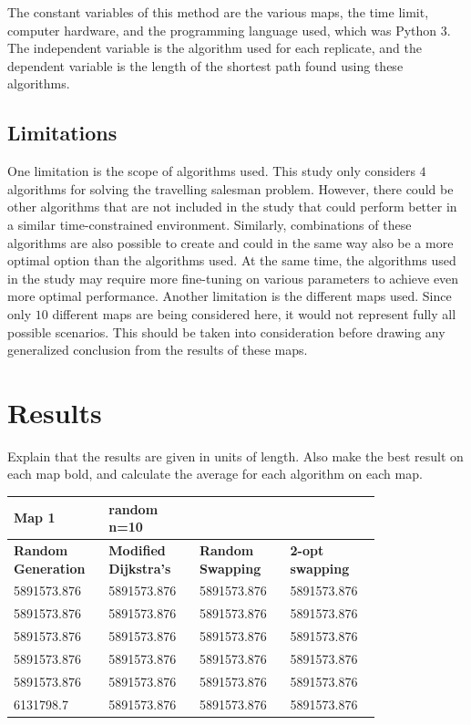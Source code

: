 \documentclass{article}
\begin{document}
\noindent
The constant variables of this method are the various maps, the time limit, computer hardware, and the programming language used, which was Python 3. The independent variable is the algorithm used for each replicate, and the dependent variable is the length of the shortest path found using these algorithms.


\subsection{Limitations}\label{Limitations}
One limitation is the scope of algorithms used. This study only considers $4$ algorithms for solving the travelling salesman problem. However, there could be other algorithms that are not included in the study that could perform better in a similar time-constrained environment. Similarly, combinations of these algorithms are also possible to create and could in the same way also be a more optimal option than the algorithms used. 
\noindent
At the same time, the algorithms used in the study may require more fine-tuning on various parameters to achieve even more optimal performance. 
\noindent
Another limitation is the different maps used. Since only $10$ different maps are being considered here, it would not represent fully all possible scenarios. This should be taken into consideration before drawing any generalized conclusion from the results of these maps.


\section{Results}\label{Results}

Explain that the results are given in units of length. 
Also make the best result on each map bold, and calculate the average for each algorithm on each map.





\begin{table}[H]
    \centering
    \begin{tabular}{|p{0.2\linewidth}|p{0.2\linewidth}|p{0.2\linewidth}|p{0.2\linewidth}|}
    \hline
        \textbf{Map 1 } & random n=10 & ~ & ~ \\ \hline
        \textbf{Random Generation} & \textbf{Modified Dijkstra's} & \textbf{Random Swapping} & \textbf{2-opt swapping} \\ \hline
        5891573.876 & 5891573.876 & 5891573.876 & 5891573.876 \\ \hline
        5891573.876 & 5891573.876 & 5891573.876 & 5891573.876 \\ \hline
        5891573.876 & 5891573.876 & 5891573.876 & 5891573.876 \\ \hline
        5891573.876 & 5891573.876 & 5891573.876 & 5891573.876 \\ \hline
        5891573.876 & 5891573.876 & 5891573.876 & 5891573.876 \\ \hline
        6131798.7 & 5891573.876 & 5891573.876 & 5891573.876 \\ \hline
    \end{tabular}
\end{table}
\end{document}
